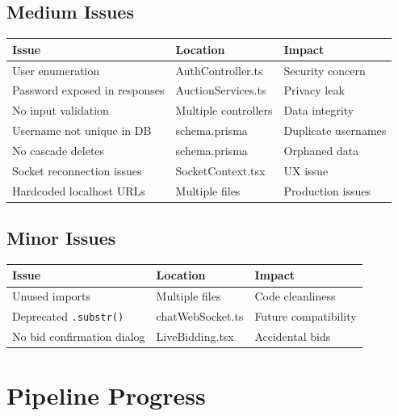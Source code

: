 \documentclass[12pt,a4paper]{article}
\begin{document}
\subsection{Medium Issues}

\begin{warningbox}
\begin{tabularx}{\textwidth}{|X|l|X|}
\hline
\textbf{Issue} & \textbf{Location} & \textbf{Impact} \\
\hline
User enumeration & AuthController.ts & Security concern \\
\hline
Password exposed in responses & AuctionServices.ts & Privacy leak \\
\hline
No input validation & Multiple controllers & Data integrity \\
\hline
Username not unique in DB & schema.prisma & Duplicate usernames \\
\hline
No cascade deletes & schema.prisma & Orphaned data \\
\hline
Socket reconnection issues & SocketContext.tsx & UX issue \\
\hline
Hardcoded localhost URLs & Multiple files & Production issues \\
\hline
\end{tabularx}
\end{warningbox}

\subsection{Minor Issues}

\begin{infobox}
\begin{tabularx}{\textwidth}{|X|l|X|}
\hline
\textbf{Issue} & \textbf{Location} & \textbf{Impact} \\
\hline
Unused imports & Multiple files & Code cleanliness \\
\hline
Deprecated \texttt{.substr()} & chatWebSocket.ts & Future compatibility \\
\hline
No bid confirmation dialog & LiveBidding.tsx & Accidental bids \\
\hline
\end{tabularx}
\end{infobox}

\section{Pipeline Progress}
\end{document}
